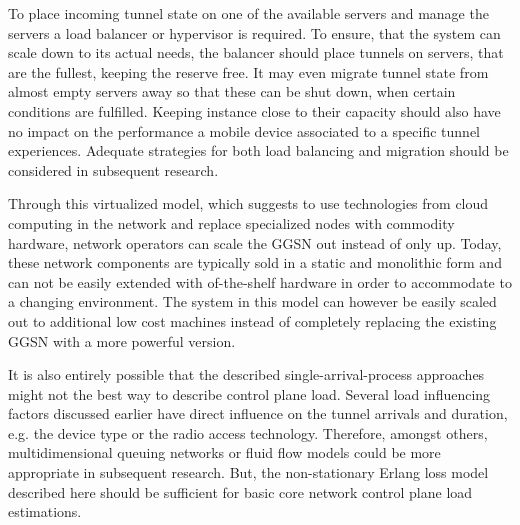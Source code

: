 To place incoming tunnel state on one of the available servers and manage the servers a load balancer or hypervisor is required. To ensure, that the system can scale down to its actual needs, the balancer should place tunnels on servers, that are the fullest, keeping the reserve free. It may even migrate tunnel state from almost empty servers away so that these can be shut down, when certain conditions are fulfilled. Keeping instance close to their capacity should also have no impact on the performance a mobile device associated to a specific tunnel experiences. Adequate strategies for both load balancing and migration should be considered in subsequent research.

Through this virtualized model, which suggests to use technologies from cloud computing in the network and replace specialized nodes with commodity hardware, network operators can scale the \gls{GGSN} out instead of only up. Today, these network components are typically sold in a static and monolithic form and can not be easily extended with of-the-shelf hardware in order to accommodate to a changing environment. The system in this model can however be easily scaled out to additional low cost machines instead of completely replacing the existing \gls{GGSN} with a more powerful version. 

It is also entirely possible that the described single-arrival-process approaches might not the best way to describe control plane load. Several load influencing factors discussed earlier have direct influence on the tunnel arrivals and duration, e.g. the device type or the radio access technology. Therefore, amongst others, multidimensional queuing networks or fluid flow models could be more appropriate in subsequent research. But, the non-stationary Erlang loss model described here should be sufficient for basic core network control plane load estimations.

